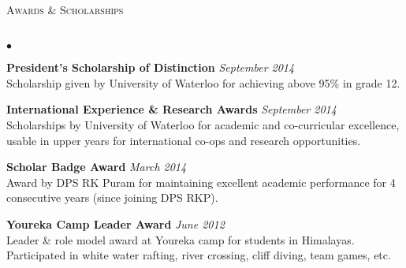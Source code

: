 \documentclass{article}
\newcommand{\lineunder}{\vspace*{-8pt} \\ \hspace*{-18pt} \hrulefill \\}
\newcommand{\header}[1]{{\hspace*{-15pt}\vspace*{6pt} \textsc{#1}} \vspace*{-6pt} \lineunder}
\newenvironment{achievements}{\begin{list}{$\bullet$}{\topsep 0pt \itemsep -1.5pt \leftmargin 5pt}}{\vspace*{4pt}\end{list}}
\begin{document}
\vspace{7pt}

\header{\normalsize Awards \& Scholarships}
\begin{achievements}
\item \textbf{President's Scholarship of Distinction} \hfill \textit {September 2014}
\\ Scholarship given by University of Waterloo for achieving above 95\% in grade 12.
\item \textbf{International Experience \& Research Awards} \hfill \textit {September 2014}
\\ Scholarships by University of Waterloo for academic and co-curricular excellence, usable in upper years for international co-ops and research opportunities.
\item \textbf{Scholar Badge Award} \hfill \textit {March 2014}
\\ Award by DPS RK Puram for maintaining excellent academic performance for 4 consecutive years (since joining DPS RKP).
\item \textbf{Youreka Camp Leader Award} \hfill \textit {June 2012}
\\ Leader \& role model award at Youreka camp for students in Himalayas. Participated in white water rafting, river crossing, cliff diving, team games, etc. \\ \hspace*{-18pt}  \\
\end{achievements}
\end{document}
